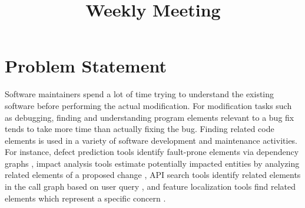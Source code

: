 \documentclass{sig-alternate}
\begin{document}



\title{Weekly Meeting } %

%
%

%
%
%

\maketitle

\section{Problem Statement}
Software maintainers spend a lot of time trying to understand the existing software before performing the actual modification. For modification tasks such as debugging, finding and understanding program elements relevant to a bug fix tends to take more time than actually fixing the bug.  Finding related code elements  is used in a variety of software development and maintenance activities. For instance, defect prediction tools identify fault-prone elements via dependency graphs \cite{Nagappan:ICSE06, Zimmermann:ICSE08, PRMiner:FSE05}, impact analysis tools estimate potentially impacted entities by analyzing related elements of a proposed change  \cite{Denys:impactMetrics13, Orso:impactDynamic03}, API search tools identify related elements in the call graph based on user query  \cite{Denys: portfolio11, sniff:Sen09}, and feature localization tools find related elements which represent a specific concern  \cite{sniafl: TSE06, Hassan:ICSE10, Hill:locateConcern07}.  
\end{document}
